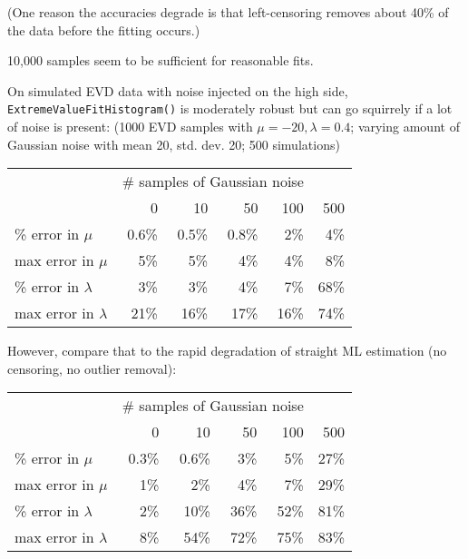 (One reason the accuracies degrade is that left-censoring removes
about 40\% of the data before the fitting occurs.)

10,000 samples seem to be sufficient for reasonable fits.

On simulated EVD data with noise injected on the high side, {\tt
ExtremeValueFitHistogram()} is moderately robust but can go squirrely
if a lot of noise is present: (1000 EVD samples with $\mu = -20,
\lambda = 0.4$; varying amount of Gaussian noise with mean 20,
std. dev. 20; 500 simulations)

\begin{center}
\begin{tabular}{lrrrrr} \hline
 & \multicolumn{4}{c}{\# samples of Gaussian noise}\\
                        & 0   &   10  &    50  &  100   & 500  \\
\% error in $\mu$       &0.6\%& 0.5\% &  0.8\% &    2\% &  4\% \\
max error in $\mu$      &  5\%&   5\% &    4\% &    4\% &  8\% \\
\% error in $\lambda$   &  3\%&   3\% &    4\% &    7\% & 68\% \\
max error in $\lambda$  & 21\%&  16\% &   17\% &   16\% & 74\% \\ \hline
\end{tabular}
\end{center}

However, compare that to the rapid degradation of straight ML
estimation (no censoring, no outlier removal):

\begin{center}
\begin{tabular}{lrrrrr} \hline
 & \multicolumn{4}{c}{\# samples of Gaussian noise}\\
                        & 0   &   10  &    50  &  100   & 500  \\
\% error in $\mu$       &0.3\%& 0.6\% &    3\% &    5\% &  27\% \\
max error in $\mu$      &  1\%&   2\% &    4\% &    7\% &  29\% \\
\% error in $\lambda$   &  2\%&   10\% &   36\% &   52\% &  81\% \\
max error in $\lambda$  &  8\%&  54\% &   72\% &   75\% &  83\% \\ \hline
\end{tabular}
\end{center}

 

